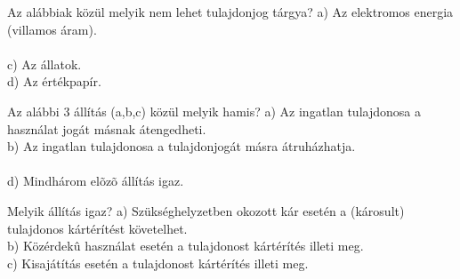 \begin{frame}

\begin{tcolorbox}[title={115. Kérdés}]
Az alábbiak közül melyik nem lehet tulajdonjog tárgya?
\tcblower
a) Az elektromos energia (villamos áram).\\
\\
c) Az állatok.\\
d) Az értékpapír.
\end{tcolorbox}

\begin{tcolorbox}[title={116. Kérdés}]
Az alábbi 3 állítás (a,b,c) közül melyik hamis?
\tcblower
a) Az ingatlan tulajdonosa a használat jogát másnak átengedheti.\\
b) Az ingatlan tulajdonosa a tulajdonjogát másra átruházhatja.\\
\\
d) Mindhárom elõzõ állítás igaz.
\end{tcolorbox}

\begin{tcolorbox}[title={117. Kérdés}]
Melyik állítás igaz?
\tcblower
a) Szükséghelyzetben okozott kár esetén a (károsult) tulajdonos kártérítést követelhet.\\
b) Közérdekû használat esetén a tulajdonost kártérítés illeti meg.\\
c) Kisajátítás esetén a tulajdonost kártérítés illeti meg.\\
\end{tcolorbox}

\end{frame}


